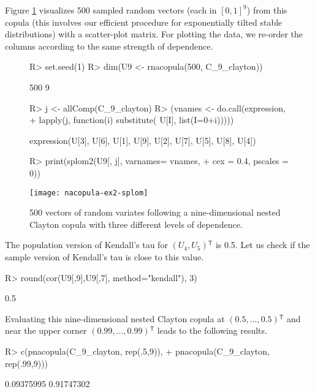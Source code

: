 \documentclass[nojss,article]{jss}
\theoremstyle{mythmstyle}
\newcommand{\tr}{\ensuremath{^\mathsf{T}}}%
\newcommand*{\setcapwidth}[1]{}
\begin{document}
Figure \ref{fig:NAC_Clayton} visualizes 500 sampled random vectors (each in $[0,1]^9$) from this copula
(this involves our efficient procedure for exponentially tilted stable
distributions) with a scatter-plot matrix. For plotting the data, we re-order the columns according to the same strength of dependence.
\begin{figure}[htbp]
\centering
\begin{Schunk}
\begin{Sinput}
R> set.seed(1)
R> dim(U9 <- rnacopula(500, C_9_clayton))
\end{Sinput}
\begin{Soutput}
[1] 500   9
\end{Soutput}
\begin{Sinput}
R> j <- allComp(C_9_clayton)
R> (vnames <- do.call(expression,
+                     lapply(j, function(i) substitute( U[I], list(I=0+i)))))
\end{Sinput}
\begin{Soutput}
expression(U[3], U[6], U[1], U[9], U[2], U[7], U[5], U[8], U[4])
\end{Soutput}
\begin{Sinput}
R> print(splom2(U9[, j], varnames= vnames,
+               cex = 0.4, pscales = 0))
\end{Sinput}
\end{Schunk}
\texttt{[image: nacopula-ex2-splom]}
\setcapwidth{\textwidth}%
  \caption{500 vectors of random variates following a nine-dimensional nested Clayton copula with three different levels of dependence.}
  \label{fig:NAC_Clayton}
\end{figure}

The population version of Kendall's tau for $(U_4,U_5)\tr$ is 0.5. Let us check
if the sample version of Kendall's tau is close to this value.
\begin{Schunk}
\begin{Sinput}
R> round(cor(U9[,9],U9[,7], method="kendall"), 3)
\end{Sinput}
\begin{Soutput}
[1] 0.5
\end{Soutput}
\end{Schunk}

Evaluating this nine-dimensional nested Clayton copula at
$(0.5,\dots,0.5)\tr$ and near the upper corner $(0.99,\dots,0.99)\tr$ leads to
the following results.
\begin{Schunk}
\begin{Sinput}
R> c(pnacopula(C_9_clayton, rep(.5,9)),
+    pnacopula(C_9_clayton, rep(.99,9)))
\end{Sinput}
\begin{Soutput}
[1] 0.09375995 0.91747302
\end{Soutput}
\end{Schunk}
\end{document}
